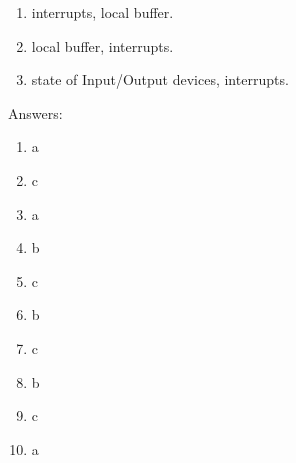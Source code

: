 \documentclass[paper=8.2in:11.6in]{scrartcl}
\begin{document}
\begin{enumerate}
\begin{enumerate}[label=\alph*)]
\item interrupts, local buffer.
\item local buffer,  interrupts.
\item state of Input/Output devices, interrupts.

\end{enumerate}

\newpage


Answers:

\begin{enumerate}[label=\arabic*)]

\item  a
\item  c
\item  a
\item  b
\item  c
\item  b
\item  c
\item  b
\item  c
\item  a


\end{enumerate}

\end{enumerate}
\end{document}
